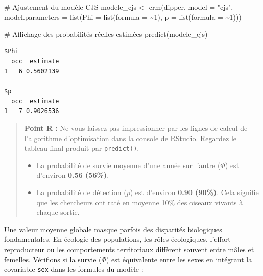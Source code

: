 \documentclass[
  french,
  a4paper,
  DIV=11,
  numbers=noendperiod,
  oneside]{scrreprt}
\newenvironment{Shaded}{}{}
\newcommand{\AttributeTok}[1]{\textcolor[rgb]{0.84,0.23,0.29}{#1}}
\newcommand{\CommentTok}[1]{\textcolor[rgb]{0.42,0.45,0.49}{#1}}
\newcommand{\DecValTok}[1]{\textcolor[rgb]{0.00,0.36,0.77}{#1}}
\newcommand{\FunctionTok}[1]{\textcolor[rgb]{0.44,0.26,0.76}{#1}}
\newcommand{\NormalTok}[1]{\textcolor[rgb]{0.14,0.16,0.18}{#1}}
\newcommand{\OtherTok}[1]{\textcolor[rgb]{0.44,0.26,0.76}{#1}}
\newcommand{\SpecialCharTok}[1]{\textcolor[rgb]{0.00,0.36,0.77}{#1}}
\newcommand{\StringTok}[1]{\textcolor[rgb]{0.01,0.18,0.38}{#1}}
\begin{document}
\begin{Shaded}
\begin{Highlighting}[]
\CommentTok{\# Ajustement du modèle CJS}
\NormalTok{modele\_cjs }\OtherTok{\textless{}{-}} \FunctionTok{crm}\NormalTok{(dipper, }
                  \AttributeTok{model =} \StringTok{"cjs"}\NormalTok{, }
                  \AttributeTok{model.parameters =} \FunctionTok{list}\NormalTok{(}\AttributeTok{Phi =} \FunctionTok{list}\NormalTok{(}\AttributeTok{formula =} \SpecialCharTok{\textasciitilde{}}\DecValTok{1}\NormalTok{), }
                                          \AttributeTok{p =} \FunctionTok{list}\NormalTok{(}\AttributeTok{formula =} \SpecialCharTok{\textasciitilde{}}\DecValTok{1}\NormalTok{)))}

\CommentTok{\# Affichage des probabilités réelles estimées}
\FunctionTok{predict}\NormalTok{(modele\_cjs)}
\end{Highlighting}
\end{Shaded}

\begin{verbatim}
$Phi
  occ  estimate
1   6 0.5602139

$p
  occ  estimate
1   7 0.9026536
\end{verbatim}

\begin{quote}
\textbf{Point R :} Ne vous laissez pas impressionner par les lignes de
calcul de l'algorithme d'optimisation dans la console de RStudio.
Regardez le tableau final produit par \texttt{predict()}.

\begin{itemize}
\item
  La probabilité de survie moyenne d'une année sur l'autre (\(\Phi\))
  est d'environ \textbf{0.56 (56\%)}.
\item
  La probabilité de détection (\(p\)) est d'environ \textbf{0.90
  (90\%)}. Cela signifie que les chercheurs ont raté en moyenne 10\% des
  oiseaux vivants à chaque sortie.
\end{itemize}
\end{quote}

Une valeur moyenne globale masque parfois des disparités biologiques
fondamentales. En écologie des populations, les rôles écologiques,
l'effort reproducteur ou les comportements territoriaux diffèrent
souvent entre mâles et femelles. Vérifions si la survie (\(\Phi\)) est
équivalente entre les sexes en intégrant la covariable \texttt{sex} dans
les formules du modèle :
\end{document}
